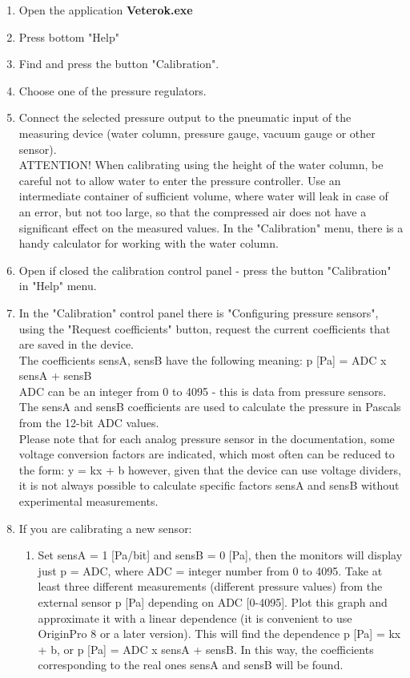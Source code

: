 \documentclass[twoside, 12pt, a4paper]{refart}
\begin{document}
      \begin{enumerate}    
        \item Open the application \textbf{Veterok.exe}
        \item Press bottom "Help" 
        \item Find and press the button "Calibration".  
        \item Choose one of the pressure regulators.
        \item Connect the selected pressure output to the pneumatic input of the measuring device (water column, pressure gauge, vacuum gauge or other sensor).\\
ATTENTION! When calibrating using the height of the water column, be careful not to allow water to enter the pressure controller. Use an intermediate container of sufficient volume, where water will leak in case of an error, but not too large, so that the compressed air does not have a significant effect on the measured values. In the "Calibration" menu, there is a handy calculator for working with the water column.
        \item Open if closed the calibration control panel - press the button "Calibration" in "Help" menu.
        \item In the "Calibration" control panel there is "Configuring pressure sensors", using the "Request coefficients" button, request the current coefficients that are saved in the device.\\
The coefficients sensA, sensB have the following meaning: p [Pa] = ADC x sensA + sensB\\
ADC can be an integer from 0 to 4095 - this is data from pressure sensors.
The sensA and sensB coefficients are used to calculate the pressure in Pascals from the 12-bit ADC values.\\
Please note that for each analog pressure sensor in the documentation, some voltage conversion factors are indicated, which most often can be reduced to the form: y = kx + b however, given that the device can use voltage dividers, it is not always possible to calculate specific factors sensA and sensB without experimental measurements.
        \item If you are calibrating a new sensor:
          \begin{enumerate} 
            \item Set sensA = 1 [Pa/bit] and sensB = 0 [Pa], then the monitors will display just p = ADC, where ADC = integer number from 0 to 4095. Take at least three different measurements (different pressure values) from the external sensor p [Pa] depending on ADC [0-4095]. Plot this graph and approximate it with a linear dependence (it is convenient to use OriginPro 8 or a later version). This will find the dependence p [Pa] = kx + b, or p [Pa] = ADC x sensA + sensB. In this way, the coefficients corresponding to the real ones sensA and sensB will be found.

\end{enumerate}
\end{enumerate}
\end{document}
